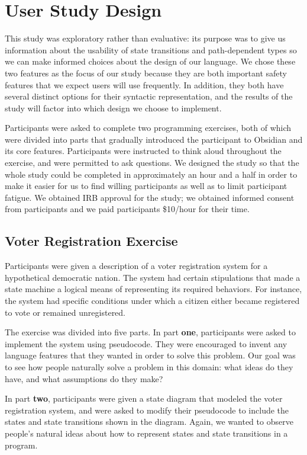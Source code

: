 \documentclass[sigplan,10pt,review]{acmart}\settopmatter{printfolios=true}
\begin{document}
\section{User Study Design}
	
This study was exploratory rather than evaluative: its purpose was to give us information about the usability of state transitions 
and path-dependent types so we can make informed choices about the design of our language. 
We chose these two features as the focus of our study because they are both important safety features 
that we expect users will use frequently. In addition, they both have several distinct options for their syntactic representation, and the results of the study will factor into which design we choose to implement.  

Participants were asked to complete two programming exercises, both of which were divided into parts that 
gradually introduced the participant to Obsidian and its core features. 
Participants were instructed to think aloud throughout the exercise, and were permitted to ask questions. We designed the study so that the whole study could be completed in approximately an hour and a half in order to make it easier for us to find willing participants as well as to limit participant fatigue. We obtained IRB approval for the study; we obtained informed consent from participants and we paid participants \$10/hour for their time.

\subsection{Voter Registration Exercise}

Participants were given a description of a voter registration system for a hypothetical democratic nation. The 
system had certain stipulations that made a state machine a logical means of representing its required behaviors. 
For instance, the system had specific conditions under which a citizen either became registered to vote 
or remained unregistered. 

The exercise was divided into five parts. In part \textbf{one}, participants were asked to implement the system using 
pseudocode. They were encouraged to invent any language features that they wanted in order to solve this 
problem. Our goal was to see how people naturally solve a problem in this domain: what ideas do they 
have, and what assumptions do they make? 
	
In part \textbf{two}, participants were given a state diagram that modeled the voter registration system, and were asked to 
modify their pseudocode to include the states and state transitions shown in the diagram. Again, we wanted to 
observe people's natural ideas about how to represent states and state transitions in a program.
\end{document}
